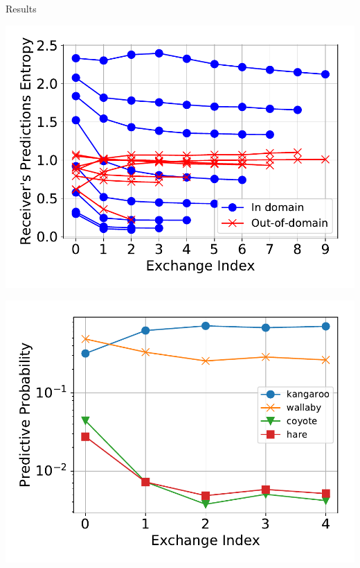 \documentclass[final]{beamer}
\newlength{\twocolwid}
\begin{document}
\begin{frame}[t]
\begin{columns}[t]
\begin{column}{\twocolwid}
\begin{block}{Results}
\begin{minipage}{.3\textwidth}
  \centering
  \includegraphics[width=\textwidth]{figures/R_pred_entropy_adaptive_in_out_big.pdf}
\end{minipage} \quad
\begin{minipage}{.3\textwidth}
  \centering
  \includegraphics[width=\textwidth]{figures/mammal_kangaroo}
\end{minipage} \quad
\begin{minipage}{.3\textwidth}
  \centering

\end{minipage}
\end{block}
\end{column}
\end{columns}
\end{frame}
\end{document}
